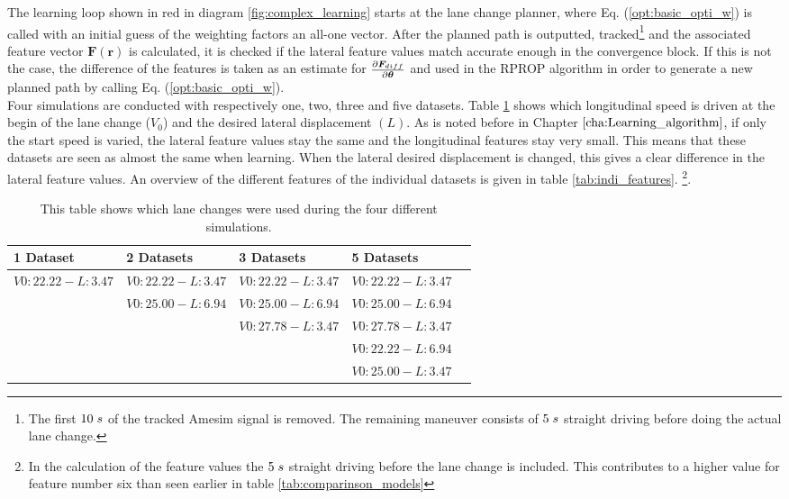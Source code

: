 The learning loop shown in red in diagram \ref{fig:complex_learning} starts at the lane change planner, where Eq. (\ref{opt:basic_opti_w}) is called with an initial guess of the weighting factors an all-one vector. After the planned path is outputted, tracked\footnote{The first $10 \hspace{1mm}s$ of the tracked Amesim signal is removed. The remaining maneuver consists of $5 \hspace{1mm}s$ straight driving before doing the actual lane change.} and the associated feature vector $\bm{F}(\bm{r})$ is calculated, it is checked if the lateral feature values match accurate enough in the convergence block. If this is not the case, the difference of the features is taken as an estimate for $\pdv{\bm{F}_{diff}}{\bm{\theta}}$ and used in the RPROP algorithm in order to generate a new planned path by calling Eq. (\ref{opt:basic_opti_w}). \\

Four simulations are conducted with respectively one, two, three and five datasets. Table \ref{tab:datasets_overview} shows which longitudinal speed is driven at the begin of the lane change ($V_{0}$) and the desired lateral displacement $(L)$. As is noted before in Chapter $\ref{cha:Learning_algorithm}$, if only the start speed is varied, the lateral feature values stay the same and the longitudinal features stay very small. This means that these datasets are seen as almost the same when learning. When the lateral desired displacement is changed, this gives a clear difference in the lateral feature values. An overview of the different features of the individual datasets is given in table \ref{tab:indi_features}. \footnote{In the calculation of the feature values the $5 \hspace{1mm}s$ straight driving before the lane change is included. This contributes to a higher value for feature number six than seen earlier in table \ref{tab:comparinson_models}}.



\begin{table}[h!]
	\centering
	\begin{tabular}{@{}llllr@{}} \toprule
		1 Dataset    & 2 Datasets & 3 Datasets & 5 Datasets\\ \midrule
     $V0:22.22 - L:3.47$  & $V0:22.22 - L:3.47$    & $V0:22.22 - L:3.47$ & $V0:22.22 - L:3.47$		\\
           			 & $V0:25.00 - L:6.94$      & $V0:25.00 - L:6.94$    & $V0:25.00 - L:6.94$  \\
	        		 &        & $V0:27.78 - L:3.47$ & $V0:27.78 - L:3.47$      \\ 
&	&	&$V0:22.22 - L:6.94$	\\
&	&	&$V0:25.00 - L:3.47$	\\\bottomrule
	\end{tabular}
	\caption{This table shows which lane changes were used during the four different simulations.}
	\label{tab:datasets_overview}
\end{table} 


